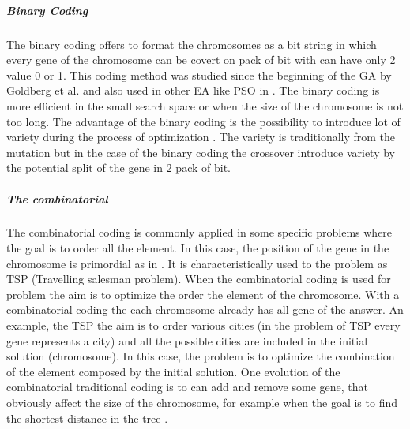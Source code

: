 \subparagraph*{Binary Coding}%
The binary coding offers to format the chromosomes as a bit string in which every gene of the chromosome can be covert on pack of bit with can have only 2 value 0 or 1. This coding method was studied since the beginning of the GA by Goldberg et al.  \cite{97*goldberg1985} and also used in other EA like PSO in \cite{87*morsly2012}. The binary coding is more efficient in the small search space or when the size of the chromosome is not too long. The advantage of the binary coding is the possibility to introduce lot of variety during the process of optimization \cite{73*wright1991}. The variety is traditionally from the mutation but in the case of the binary coding the crossover introduce variety by the potential split of the gene in 2 pack of bit.
\\
\subparagraph*{The combinatorial  }%
The combinatorial  coding is commonly applied in some specific problems where the goal is to order all the element. In this case, the position of the gene in the chromosome is primordial as in \cite{ 110*eiben2003}. It is characteristically used to the problem as TSP \cite{80*serpell2010} (Travelling salesman problem).  When the combinatorial  coding is used for problem the aim is to optimize the order the element of the chromosome. With a combinatorial  coding the each chromosome already has all gene of the answer. An example, the TSP the aim is to order various cities (in the problem of TSP every gene represents a city) and all the possible cities are included in the initial solution (chromosome). In this case, the problem is to optimize the combination of the element composed by the initial solution. 
One evolution of the combinatorial traditional coding is to can add and remove some gene, that obviously affect the size of the chromosome, for example  when the goal is to find the shortest distance in the tree \cite{113*mais2010}. \\


